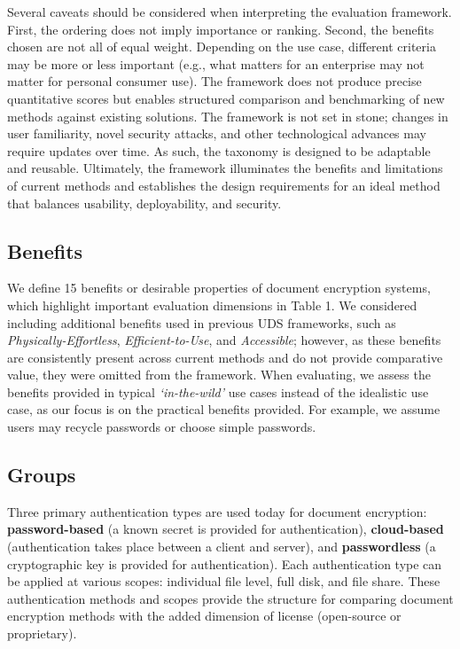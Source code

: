\documentclass[sigconf]{acmart}
\begin{document}
Several caveats should be considered when interpreting the evaluation framework. First, the ordering does not imply importance or ranking. Second, the benefits chosen are not all of equal weight. Depending on the use case, different criteria may be more or less important (e.g., what matters for an enterprise may not matter for personal consumer use). The framework does not produce precise quantitative scores but enables structured comparison and benchmarking of new methods against existing solutions. The framework is not set in stone; changes in user familiarity, novel security attacks, and other technological advances may require updates over time. As such, the taxonomy is designed to be adaptable and reusable. Ultimately, the framework illuminates the benefits and limitations of current methods and establishes the design requirements for an ideal method that balances usability, deployability, and security.

\subsection{Benefits}
We define 15 benefits or desirable properties of document
encryption systems, which highlight important evaluation
dimensions in Table 1. We considered including additional benefits used in previous UDS frameworks, such as \textit{Physically-Effortless}, \textit{Efficient-to-Use}, and \textit{Accessible}; however, as these benefits are consistently present across current methods and do not provide comparative value, they were omitted from the framework. When evaluating, we assess the benefits provided in typical \textit{‘in-the-wild’} use cases instead of the idealistic use case, as our focus is on the practical benefits provided. For example, we assume users may recycle passwords or choose simple passwords.

\subsection{Groups}
Three primary authentication types are used today for document encryption: \textbf{password-based} (a known secret is provided for authentication), \textbf{cloud-based} (authentication takes place between a client and server), and \textbf{passwordless} (a cryptographic key is provided for authentication). Each authentication type can be applied at various scopes: individual file level, full disk, and file share. These authentication methods and scopes provide the structure for comparing document encryption methods with the added dimension of license (open-source or proprietary).
\end{document}
